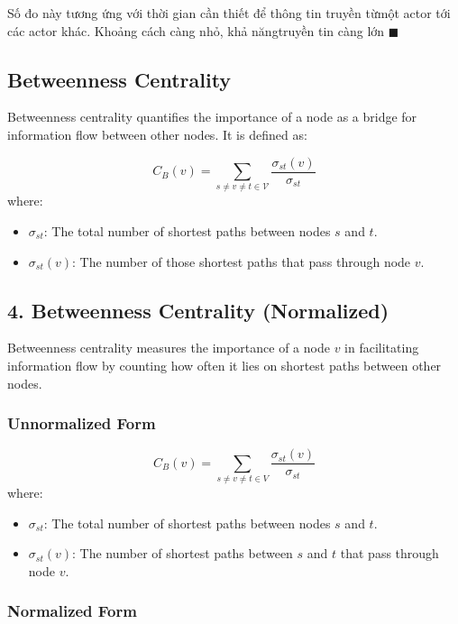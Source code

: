 \documentclass[12pt, a4paper,oneside]{book}
\newenvironment{luuy}{\fontfamily{bch}\HandPencilLeft \selectfont{\textbf{ Note.}} \normalfont}{ \hfill \ensuremath{\blacksquare}}
\begin{document}
\begin{luuy}
    Số đo này tương ứng với thời gian cần thiết để thông tin truyền từmột actor tới các actor khác. Khoảng cách càng nhỏ, khả năngtruyền tin càng lớn
\end{luuy}


\subsection{Betweenness Centrality}
Betweenness centrality quantifies the importance of a node as a bridge for information flow between other nodes. It is defined as:

\[
C_B(v) = \sum_{s \neq v \neq t \in\mathcal{V}} \frac{\sigma_{st}(v)}{\sigma_{st}}
\]
where:
\begin{itemize}
    \item \( \sigma_{st} \): The total number of shortest paths between nodes \( s \) and \( t \).
    \item \( \sigma_{st}(v) \): The number of those shortest paths that pass through node \( v \).
\end{itemize}

\subsection*{4. Betweenness Centrality (Normalized)}

Betweenness centrality measures the importance of a node \( v \) in facilitating information flow by counting how often it lies on shortest paths between other nodes.

\subsubsection*{Unnormalized Form}
\[
C_B(v) = \sum_{s \neq v \neq t \in V} \frac{\sigma_{st}(v)}{\sigma_{st}}
\]
where:
\begin{itemize}
    \item \( \sigma_{st} \): The total number of shortest paths between nodes \( s \) and \( t \).
    \item \( \sigma_{st}(v) \): The number of shortest paths between \( s \) and \( t \) that pass through node \( v \).
\end{itemize}

\subsubsection*{Normalized Form}
\end{document}

